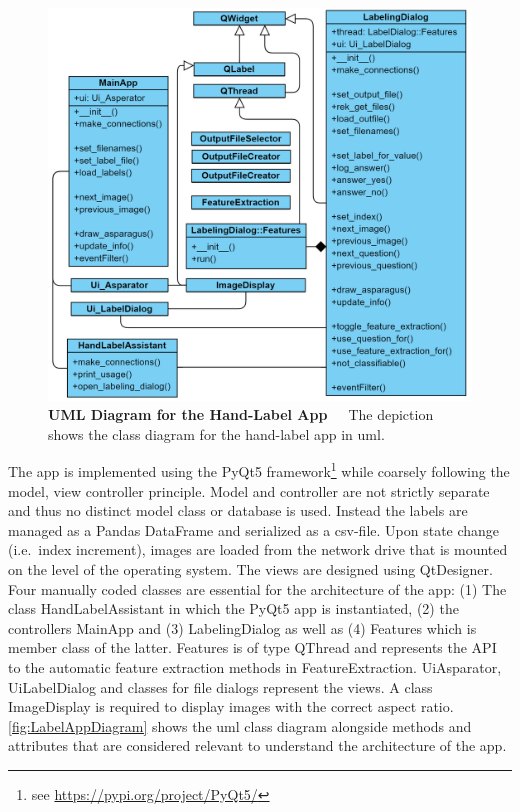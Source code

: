 \begin{figure}[!t]
	\centering
	\includegraphics[scale=0.3]{Figures/chapter03/label_app_diagram.png}
	\decoRule
	\caption[UML Diagram for the Hand-Label App]{\textbf{UML Diagram for the Hand-Label App}~~~The depiction shows the class diagram for the hand-label app in \acrshort{uml}.}
	\label{fig:LabelAppDiagram}
\end{figure}

The app is implemented using the PyQt5 framework\footnote{see \url{https://pypi.org/project/PyQt5/}} while coarsely following the model, view controller principle. Model and controller are not strictly separate and thus no distinct model class or database is used. Instead the labels are managed as a Pandas DataFrame and serialized as a csv-file. Upon state change (i.e.\ index increment), images are loaded from the network drive that is mounted on the level of the operating system. The views are designed using QtDesigner. Four manually coded classes are essential for the architecture of the app: (1) The class HandLabelAssistant in which the PyQt5 app is instantiated, (2) the controllers MainApp and (3) LabelingDialog as well as (4) Features which is member class of the latter. Features is of type QThread and represents the API to the automatic feature extraction methods in FeatureExtraction. Ui\textunderscore Asparator, UiLabelDialog and classes for file dialogs represent the views. A class ImageDisplay is required to display images with the correct aspect ratio. \autoref{fig:LabelAppDiagram} shows the \acrshort{uml} class diagram alongside methods and attributes that are considered relevant to understand the architecture of the app. 

